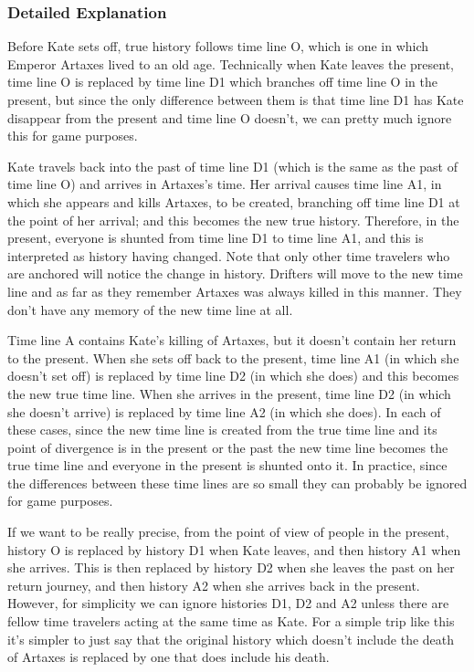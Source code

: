 \begin{multicols*}{2}
\subsubsection{Detailed Explanation}
Before Kate sets off, true history follows time line O, which is one in which Emperor Artaxes lived to an old age. Technically when Kate leaves the present, time line O is replaced by time line D1 which branches off time line O in the present, but since the only difference between them is that time line D1 has Kate disappear from the present and time line O doesn't, we can pretty much ignore this for game purposes.

Kate travels back into the past of time line D1 (which is the same as the past of time line O) and arrives in Artaxes’s time. Her arrival causes time line A1, in which she appears and kills Artaxes, to be created, branching off time line D1 at the point of her arrival; and this becomes the new true history. Therefore, in the present, everyone is shunted from time line D1 to time line A1, and this is interpreted as history having changed. Note that only other time travelers who are anchored will notice the change in history. Drifters will move to the new time line and as far as they remember Artaxes was always killed in this manner. They don’t have any memory of the new time line at all.

Time line A contains Kate’s killing of Artaxes, but it doesn’t contain her return to the present. When she sets off back to the present, time line A1 (in which she doesn’t set off) is replaced by time line D2 (in which she does) and this becomes the new true time line. When she arrives in the present, time line D2 (in which she doesn’t arrive) is replaced by time line A2 (in which she does). In each of these cases, since the new time line is created from the true time line and its point of divergence is in the present or the past the new time line becomes the true time line and everyone in the present is shunted onto it. In practice, since the differences between these time lines are so small they can probably be ignored for game purposes.

If we want to be really precise, from the point of view of people in the present, history O is replaced by history D1 when Kate leaves, and then history A1 when she arrives. This is then replaced by history D2 when she leaves the past on her return journey, and then history A2 when she arrives back in the present. However, for simplicity we can ignore histories D1, D2 and A2 unless there are fellow time travelers acting at the same time as Kate. For a simple trip like this it’s simpler to just say that the original history which doesn’t include the death of Artaxes is replaced by one that does include his death. 


\end{multicols*}

